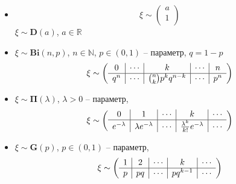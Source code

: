 \begin{defs}
	\begin{multicols}{2}
	\begin{itemize}
			\item {}
			\[ \xi \sim \left( \begin{array}{c}
				a \\ \hline
				1 \\
			\end{array} \right) \]
			$\xi \sim \boldsymbol{D}(a)$, $a \in \mathbb{R}$
			\item {}
			$\xi \sim \boldsymbol{Bi}(n,p)$, $n \in \mathbb{N}$, $p \in (0,1)$ -- параметр, $q=1-p$
			\[ \xi \sim \left( \begin{array}{ccccc}
				0 & \multicolumn{1}{|c}{\cdots} & \multicolumn{1}{|c}{k} & \multicolumn{1}{|c}{\cdots} & \multicolumn{1}{|c}{n}\\ \hline
				q^{n} & \multicolumn{1}{|c}{\cdots} & \multicolumn{1}{|c}{\binom{n}{k}p^{k}q^{n-k}} & \multicolumn{1}{|c}{\cdots} & \multicolumn{1}{|c}{p^{n}}\\
			\end{array} \right) \]
			\item {}
			$\xi \sim \boldsymbol{\Pi}(\lambda)$, $\lambda > 0$ -- параметр,
			\[ \xi \sim \left( \begin{array}{ccccc}
				0 & \multicolumn{1}{|c}{1} & \multicolumn{1}{|c}{\cdots} & \multicolumn{1}{|c}{k} & \multicolumn{1}{|c}{\cdots}\\ \hline
				e^{-\lambda} & \multicolumn{1}{|c}{\lambda e^{-\lambda}} & \multicolumn{1}{|c}{\cdots} & \multicolumn{1}{|c}{\frac{\lambda^{k}}{k!} e^{-\lambda}} & \multicolumn{1}{|c}{\cdots}\\
			\end{array} \right) \]
			\item {}
			$\xi \sim \boldsymbol{G}(p)$, $p \in (0,1)$ -- параметр,
			\[ \xi \sim \left( \begin{array}{ccccc}
				1 & \multicolumn{1}{|c}{2} & \multicolumn{1}{|c}{\cdots} & \multicolumn{1}{|c}{k} & \multicolumn{1}{|c}{\cdots}\\ \hline
				p & \multicolumn{1}{|c}{pq} & \multicolumn{1}{|c}{\cdots} & \multicolumn{1}{|c}{pq^{k-1}} & \multicolumn{1}{|c}{\cdots}\\
			\end{array} \right) \]
	\end{itemize}
	\end{multicols}
\end{defs}


